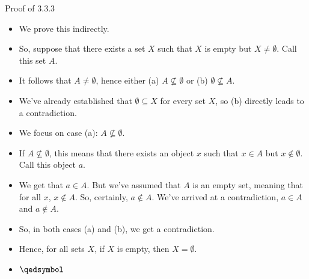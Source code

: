 \documentclass[../slides.tex]{subfiles}
\begin{document}
\begin{frame}{Proof of 3.3.3}

	\begin{itemize}

		\item We prove this indirectly. 
		
		\item So, suppose that there exists a set $X$ such that $X$ is empty but $X\neq\emptyset$.  Call this set $A$.
		
		\item It follows that $A\neq \emptyset$, hence either (a) $A\nsubseteq \emptyset$ or (b) $\emptyset\nsubseteq A$. 
		
		\item We've already established that $\emptyset\subseteq X$ for every set $X$, so (b) directly leads to a contradiction.
		
		\item We focus on case (a): $A\nsubseteq \emptyset$.
		
		\item If $A\nsubseteq \emptyset$, this means that there exists an object $x$ such that $x\in A$ but $x\notin \emptyset$. Call this object $a$. 
		
		\item We get that $a\in A$. But we've assumed that $A$ is an empty set, meaning that for all $x$, $x\notin A$. So, certainly, $a\notin A$. We've arrived at a contradiction, $a\in A$ and $a\notin A$.
		
		\item So, in both cases (a) and (b), we get a contradiction. 
		
		\item Hence, for all sets $X$, if $X$ is empty, then $X=\emptyset$.
		
		\item $\qedsymbol$
		
		\end{itemize}

\end{frame}
\end{document}
